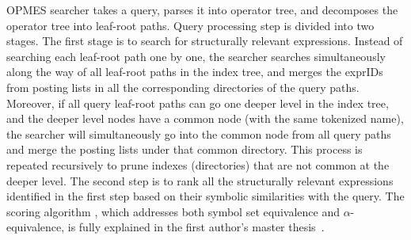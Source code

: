 \documentclass{llncs}
\begin{document}
OPMES searcher takes a query, parses it into operator tree, and decomposes the operator tree into leaf-root paths.
Query processing step is divided into two stages.  The first stage is to search for structurally relevant expressions. 
Instead of searching each leaf-root path one by one, the searcher searches simultaneously along the way of all leaf-root paths in the index tree, and merges the exprIDs from posting lists in all the corresponding directories of the query paths.
Moreover, if all query leaf-root paths can go one deeper level in the index tree, and the deeper level nodes have a common node (with the same tokenized name), the searcher will simultaneously go into the common node from all query paths and merge the posting lists under that common directory.  This process is repeated recursively to prune indexes (directories) that are not common at the deeper level.
The second step is to rank all the structurally relevant expressions identified in the first step 
based on their symbolic similarities with the query.  
The scoring algorithm , 
which addresses both symbol set equivalence and $\alpha$-equivalence, is fully explained in 
the first author's master thesis~\cite{mythesis}.
\end{document}
